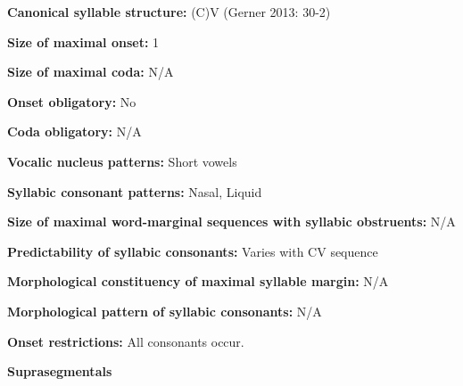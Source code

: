 \begin{styleBody}
\textbf{Canonical syllable structure:} (C)V\textbf{ }(Gerner 2013: 30-2)
\end{styleBody}

\begin{styleBody}
\textbf{Size of maximal onset:} 1
\end{styleBody}

\begin{styleBody}
\textbf{Size of maximal coda:} N/A
\end{styleBody}

\begin{styleBody}
\textbf{Onset obligatory:} No
\end{styleBody}

\begin{styleBody}
\textbf{Coda obligatory:} N/A
\end{styleBody}

\begin{styleBody}
\textbf{Vocalic nucleus patterns:} Short vowels
\end{styleBody}

\begin{styleBody}
\textbf{Syllabic consonant patterns:} Nasal, Liquid
\end{styleBody}

\begin{styleBody}
\textbf{Size of maximal word{}-marginal sequences with syllabic obstruents:} N/A
\end{styleBody}

\begin{styleBody}
\textbf{Predictability of syllabic consonants:} Varies with CV sequence
\end{styleBody}

\begin{styleBody}
\textbf{Morphological constituency of maximal syllable margin:} N/A
\end{styleBody}

\begin{styleBody}
\textbf{Morphological pattern of syllabic consonants:} N/A
\end{styleBody}

\begin{styleBody}
\textbf{Onset restrictions: }All consonants occur.
\end{styleBody}

\begin{styleBody}
\textbf{Suprasegmentals}
\end{styleBody}

